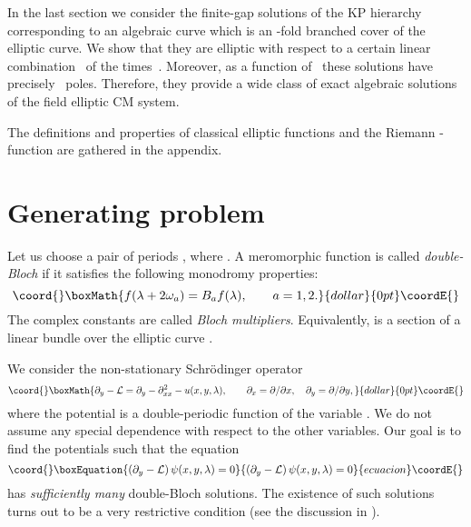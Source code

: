 \documentclass[a4paper,11pt]{article}
\providecommand{\p}{\partial}
\providecommand{\comp}{\mathbb C}
\providecommand{\inte}{\mathbb Z}
\providecommand{\cL}{{\cal L}}
\providecommand{\cE}{{\cal E}}
\theoremstyle{plain}
\theoremstyle{remark}
\begin{document}
In the last section we consider the finite-gap solutions of the KP
hierarchy corresponding to an algebraic curve which is an \coordHE{}-fold
branched cover of the elliptic curve. We show that they are elliptic with
respect to a certain linear combination~\myHighlight{$\lambda$}\coordHE{} of the times~\coordHE{}.
Moreover, as a function of~\myHighlight{$\lambda$}\coordHE{} these solutions have precisely~\coordHE{}
poles.  Therefore, they provide a wide class of exact algebraic
solutions of the field elliptic CM system.

The definitions and properties of classical elliptic functions
and the Riemann \myHighlight{$\theta$}\coordHE{}-function are gathered in the appendix.

\section{Generating problem}

Let us choose a pair of periods \myHighlight{$2\omega_1, 2\omega_2\in\comp$}\coordHE{},
where \coordHE{}.
A meromorphic function \coordHE{} is called \emph{double-Bloch}
if it satisfies the following monodromy properties:
$$\coord{}\boxMath{
f(\lambda+2\omega_a)=B_a f(\lambda),\qquad a=1,2.
}{dollar}{0pt}\coordE{}$$
The complex constants \coordHE{} are called \emph{Bloch multipliers}.
Equivalently, \coordHE{} is a section of a linear bundle over
the elliptic curve \myHighlight{$\cE=\comp/\inte[2\omega_1,2\omega_2]$}\coordHE{}.

We consider the non-stationary Schr\"odinger operator
$$\coord{}\boxMath{
\p_y-\cL=\p_y-\p^2_{xx}-u(x,y,\lambda),
\qquad \p_x=\p/\p x, \quad \p_y=\p/\p y ,
}{dollar}{0pt}\coordE{}$$
where the potential \coordHE{} is a double-periodic function of
the variable \myHighlight{$\lambda$}\coordHE{}. We do not assume any special dependence
with respect to the other variables. Our goal is to find the
potentials \coordHE{} such that the equation
\begin{equation}\coord{}\boxEquation{\label{sch}
\left(\p_y-\cL \right) \psi(x,y,\lambda) = 0
}{\left(\p_y-\cL \right) \psi(x,y,\lambda) = 0
}{ecuacion}\coordE{}\end{equation}
has \emph{sufficiently many} double-Bloch solutions.
The existence of such solutions turns out to be a very
restrictive condition (see the discussion in \cite{krnest}).
\end{document}
